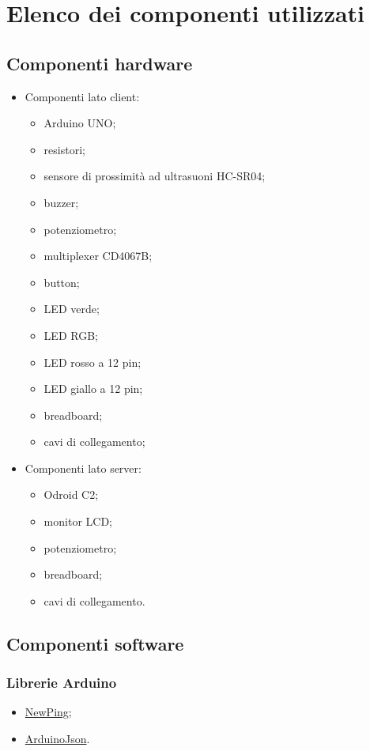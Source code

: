 \chapter{Elenco dei componenti utilizzati}

\section{Componenti hardware}
\begin{itemize}
	\item Componenti lato client:
	\begin{itemize}
		\item Arduino UNO;
		\item resistori;
		\item sensore di prossimità ad ultrasuoni HC-SR04;
		\item buzzer;
		\item potenziometro;
		\item multiplexer CD4067B;
		\item button;
		\item LED verde;
		\item LED RGB;
		\item LED rosso a 12 pin;
		\item LED giallo a 12 pin;
		\item breadboard;
		\item cavi di collegamento;
	\end{itemize}
\end{itemize}

\begin{itemize}
	\item Componenti lato server:
	\begin{itemize}
		\item Odroid C2;
		\item monitor LCD;
		\item potenziometro;
		\item breadboard;
		\item cavi di collegamento.
	\end{itemize}
\end{itemize}

\section{Componenti software}
\subsection{Librerie Arduino}
\begin{itemize}
	\item \href{http://playground.arduino.cc/Code/NewPing}{NewPing};
	\item \href{https://github.com/bblanchon/ArduinoJson}{ArduinoJson}.
\end{itemize}


